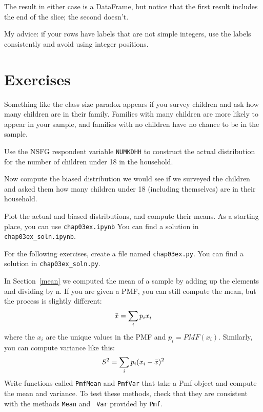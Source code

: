 \documentclass[12pt]{book}
\begin{document}
The result in either case is a DataFrame, but notice that the first
result includes the end of the slice; the second doesn't.

My advice: if your rows have labels that are not simple integers, use
the labels consistently and avoid using integer positions.



\section{Exercises}

\begin{exercise}
Something like the class size paradox appears if you survey children
and ask how many children are in their family.  Families with many
children are more likely to appear in your sample, and
families with no children have no chance to be in the sample.

Use the NSFG respondent variable \verb"NUMKDHH" to construct the actual
distribution for the number of children under 18 in the household.

Now compute the biased distribution we would see if we surveyed the
children and asked them how many children under 18 (including themselves)
are in their household.  

Plot the actual and biased distributions, and compute their means.
As a starting place, you can use \verb"chap03ex.ipynb"
You can find a solution in \verb"chap03ex_soln.ipynb".
\end{exercise}


For the following exercises, create a file named {\tt chap03ex.py}.
You can find a solution in \verb"chap03ex_soln.py".

\begin{exercise}
%
%
In Section~\ref{mean} we computed the mean of a sample by adding up
the elements and dividing by n.  If you are given a PMF, you can
still compute the mean, but the process is slightly different:
%
\[ \bar{x} = \sum_i p_i x_i \]
%
where the $x_i$ are the unique values in the PMF and $p_i=PMF(x_i)$.
Similarly, you can compute variance like this:
%
\[ S^2 = \sum_i p_i (x_i - \bar{x})^2\]
% 
Write functions called {\tt PmfMean} and {\tt PmfVar} that take a
Pmf object and compute the mean and variance.  To test these methods,
check that they are consistent with the methods {\tt Mean} and {\tt
  Var} provided by {\tt Pmf}.
\end{exercise}
\end{document}
